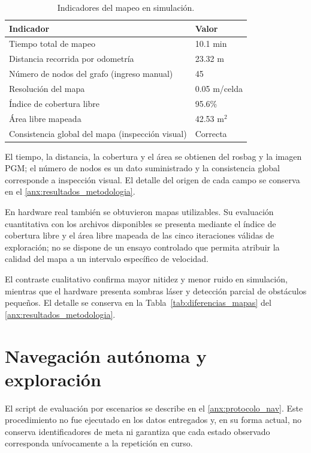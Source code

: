\begin{table}[H]
\centering
\caption{Indicadores del mapeo en simulación.}
\label{tab:slam_sim_indicadores}
\small
\begin{tabular}{p{8.9cm} p{2.5cm}}
\toprule
\textbf{Indicador} & \textbf{Valor} \\
\midrule
Tiempo total de mapeo & 10.1 min \\
Distancia recorrida por odometría & 23.32 m \\
Número de nodos del grafo (ingreso manual) & 45 \\
Resolución del mapa & 0.05 m/celda \\
Índice de cobertura libre & 95.6\% \\
Área libre mapeada & 42.53 m$^2$ \\
Consistencia global del mapa (inspección visual) & Correcta \\
\bottomrule
\end{tabular}
\end{table}

\noindent El tiempo, la distancia, la cobertura y el área se obtienen del
rosbag y la imagen PGM; el número de nodos es un dato suministrado y la
consistencia global corresponde a inspección visual. El detalle del origen de
cada campo se conserva en el \ref{anx:resultados_metodologia}.

En hardware real también se obtuvieron mapas utilizables. Su evaluación cuantitativa con los archivos disponibles se presenta mediante el índice de cobertura libre y el área libre mapeada de las cinco iteraciones válidas de exploración; no se dispone de un ensayo controlado que permita atribuir la calidad del mapa a un intervalo específico de velocidad.

El contraste cualitativo confirma mayor nitidez y menor ruido en
simulación, mientras que el hardware presenta sombras láser y detección parcial
de obstáculos pequeños. El detalle se conserva en la
Tabla~\ref{tab:diferencias_mapas} del \ref{anx:resultados_metodologia}.

\section{Navegación autónoma y exploración}
\label{sec:resultados_nav2}

El script de evaluación por escenarios  se describe en el \ref{anx:protocolo_nav}. Este procedimiento no fue ejecutado en los datos entregados y, en su forma actual, no conserva identificadores de meta ni garantiza que cada estado observado corresponda unívocamente a la repetición en curso.

